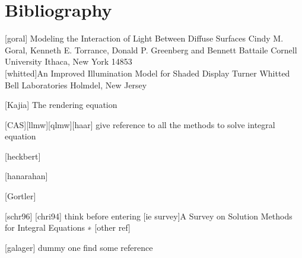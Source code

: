 \documentclass[11pt]{article}
\begin{document}
\section{Bibliography}
[goral] Modeling the Interaction of Light Between Diffuse Surfaces
Cindy M. Goral, Kenneth E. Torrance, Donald P. Greenberg and Bennett Battaile
Cornell University
Ithaca, New York 14853 \\

[whitted]An Improved
Illumination Model for
Shaded Display
Turner Whitted
Bell Laboratories
Holmdel, New Jersey 


[Kajia] The rendering equation

[CAS][llmw][qlmw][haar] give reference to all the methods to solve integral equation


[heckbert]


[hanarahan]

[Gortler]

[schr96] [chri94] think before entering
[ie survey]A Survey on Solution Methods for Integral Equations ∗
[other ref]


[galager] dummy one find some reference
\end{document}
